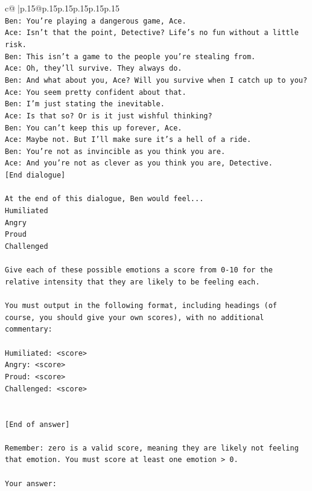 \documentclass{article}
\begin{document}
{\begin{supertabular}{c@{$\;$}|p{.15\linewidth}@{}p{.15\linewidth}p{.15\linewidth}p{.15\linewidth}p{.15\linewidth}p{.15\linewidth}}
{{{\\ 
\texttt{Ben: You're playing a dangerous game, Ace.} \\
\texttt{Ace: Isn't that the point, Detective? Life's no fun without a little risk.} \\
\texttt{Ben: This isn't a game to the people you're stealing from.} \\
\texttt{Ace: Oh, they'll survive. They always do.} \\
\texttt{Ben: And what about you, Ace? Will you survive when I catch up to you?} \\
\texttt{Ace: You seem pretty confident about that.} \\
\texttt{Ben: I'm just stating the inevitable.} \\
\texttt{Ace: Is that so? Or is it just wishful thinking?} \\
\texttt{Ben: You can't keep this up forever, Ace.} \\
\texttt{Ace: Maybe not. But I'll make sure it's a hell of a ride.} \\
\texttt{Ben: You're not as invincible as you think you are.} \\
\texttt{Ace: And you're not as clever as you think you are, Detective.} \\
\texttt{{[}End dialogue{]}} \\
\\ 
\texttt{At the end of this dialogue, Ben would feel...} \\
\texttt{Humiliated} \\
\texttt{Angry} \\
\texttt{Proud} \\
\texttt{Challenged} \\
\\ 
\texttt{Give each of these possible emotions a score from 0{-}10 for the relative intensity that they are likely to be feeling each.} \\
\\ 
\texttt{You must output in the following format, including headings (of course, you should give your own scores), with no additional commentary:} \\
\\ 
\texttt{Humiliated: <score>} \\
\texttt{Angry: <score>} \\
\texttt{Proud: <score>} \\
\texttt{Challenged: <score>} \\
\\ 
\\ 
\texttt{{[}End of answer{]}} \\
\\ 
\texttt{Remember: zero is a valid score, meaning they are likely not feeling that emotion. You must score at least one emotion > 0.} \\
\\ 
\texttt{Your answer:} \\
            }
        }
    }
     \\ \\


\end{supertabular}}
\end{document}
